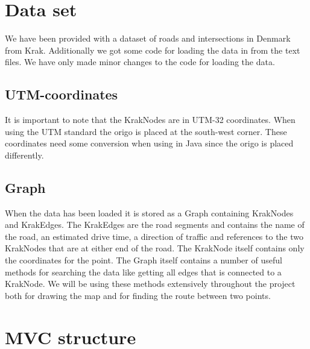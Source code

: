 \section{Data set}
\label{BG-DS}
We have been provided with a dataset of roads and intersections in Denmark 
from Krak. Additionally we got some code for loading the data in from the 
text files. We have only made minor changes to the code for loading the data.
\subsection{UTM-coordinates}
\label{BG-DS-UTM}
It is important to note that the KrakNodes are in UTM-32 coordinates. When 
using the UTM standard the origo is placed at the south-west corner. These 
coordinates need some conversion when using in Java since the origo is placed 
differently.
\subsection{Graph}
\label{BG-DS-G}
When the data has been loaded it is stored as a Graph containing KrakNodes 
and KrakEdges. The KrakEdges are the road segments and contains the name 
of the road, an estimated drive time, a direction of traffic and references 
to the two KrakNodes that are at either end of the road.  The KrakNode itself 
contains only the coordinates for the point.
The Graph itself contains a number of useful methods for searching the data 
like getting all edges that is connected to a KrakNode. We will be using these 
methods extensively throughout the project both for drawing the map and for 
finding the route between two points.
\section{MVC structure}
\label{BG-MVC}